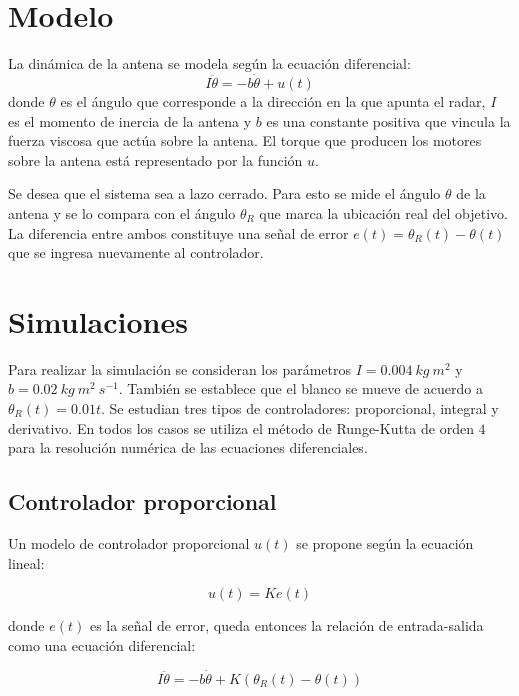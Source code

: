 \documentclass{sig-alternate}
\begin{document}
\section{Modelo}\label{modelo}
La din\'{a}mica de la antena se modela seg\'{u}n la ecuaci\'{o}n diferencial:
\begin{equation}
\label{dinamica_antena}
I \ddot\theta = - b \dot\theta + u(t)
\end{equation}
donde $\theta$ es el \'{a}ngulo que corresponde a la direcci\'{o}n en la que
apunta el radar, $I$ es el momento de inercia de la antena y $b$ es una 
constante positiva que vincula la fuerza viscosa que act\'{u}a sobre la antena.
El torque que producen los motores sobre la antena est\'{a} representado por 
la funci\'{o}n $u$.

Se desea que el sistema sea a lazo cerrado. Para esto se mide el \'{a}ngulo
$\theta$ de la antena y se lo compara con el \'{a}ngulo $\theta_{R}$ que marca
la ubicaci\'{o}n real del objetivo. La diferencia entre ambos constituye una
se\~{n}al de error $e(t) = \theta_{R}(t) - \theta(t)$ que se ingresa nuevamente 
al controlador.

\section{Simulaciones}\label{simulaciones}
Para realizar la simulaci\'{o}n se consideran los par\'{a}metros 
$I = 0.004\ kg\ m^{2}$ y $b = 0.02\ kg\  m^{2}\ s^{-1}$. Tambi\'{e}n se establece
que el blanco se mueve de acuerdo a $\theta_{R}(t) = 0.01 t$.
Se estudian tres tipos de controladores: proporcional, integral y derivativo.
En todos los casos se utiliza el m\'{e}todo de Runge-Kutta de orden $4$ para
la resoluci\'{o}n num\'{e}rica de las ecuaciones diferenciales.

\subsection{Controlador proporcional}\label{proporcional}
Un modelo de controlador proporcional $u(t)$ se propone seg\'{u}n la ecuaci\'{o}n lineal:

\begin{equation}
\label{error_modelo}
u(t) = K e(t)
\end{equation}

donde $e(t)$ es la se\~nal de error, queda entonces la relaci\'{o}n de entrada-salida como una ecuaci\'{o}n diferencial:

\begin{equation}
\label{ecuacion_modelo1}
I \ddot\theta = - b \dot\theta + K(\theta_R(t) - \theta(t))
\end{equation}
\end{document}
